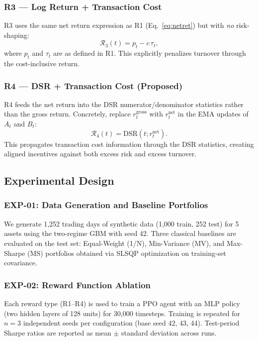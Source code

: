 \documentclass[conference]{IEEEtran}
\begin{document}
\subsubsection{R3 --- Log Return + Transaction Cost}
R3 uses the same net return expression as R1
(Eq.~\ref{eq:netret}) but with\textit{ no} risk-shaping:
\begin{equation}
\mathcal{R}_3(t) = p_t - c\,\tau_t,
\end{equation}
where $p_t$ and $\tau_t$ are as defined in R1.
This explicitly penalizes turnover through the cost-inclusive return.

\subsubsection{R4 --- DSR + Transaction Cost (Proposed)}
R4 feeds the net return into the DSR numerator/denominator statistics
rather than the gross return. Concretely, replace $r_t^{\mathrm{gross}}$
with $r_t^{\mathrm{net}}$ in the EMA updates of $A_t$ and $B_t$:
\begin{equation}
\mathcal{R}_4(t) = \mathrm{DSR}(t; r_t^{\mathrm{net}}).
\end{equation}
This propagates transaction cost information through the DSR statistics,
creating aligned incentives against both excess risk and excess turnover.

\subsection{Experimental Design}

\subsubsection{EXP-01: Data Generation and Baseline Portfolios}
We generate 1,252 trading days of synthetic data (1,000 train, 252 test) for 5
assets using the two-regime GBM with seed 42. Three classical baselines are
evaluated on the test set: Equal-Weight (1/N), Min-Variance (MV), and Max-Sharpe
(MS) portfolios obtained via SLSQP optimization on training-set covariance.

\subsubsection{EXP-02: Reward Function Ablation}
Each reward type (R1–R4) is used to train a PPO agent with an MLP policy
(two hidden layers of 128 units) for 30,000 timesteps. Training is repeated for
$n=3$ independent seeds per configuration (base seed 42, 43, 44). Test-period
Sharpe ratios are reported as mean $\pm$ standard deviation across runs.
\end{document}
